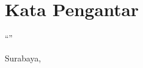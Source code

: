 \chapter*{Kata Pengantar}

\vfill

    \begin{center}
        \makeatletter
        ``\noindent\MakeUppercase{\@judul}''
        \makeatother
    \end{center}


\makeatletter
\begin{flushright}
    Surabaya, \@tanggal \@bulan \@tahun

    \vspace{2cm}
    \@nama
\end{flushright}
\makeatother